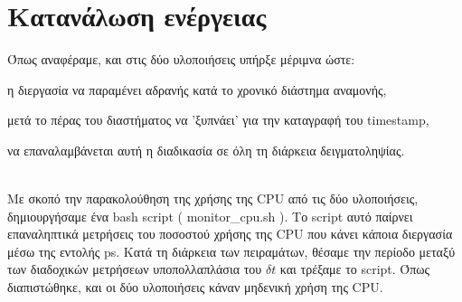 \documentclass[a4paper,12pt]{article}
\begin{document}
\section{Κατανάλωση ενέργειας} 
Όπως αναφέραμε, και στις δύο υλοποιήσεις υπήρξε μέριμνα ώστε:
\begin{inparaitem}
\item η διεργασία να παραμένει αδρανής κατά το χρονικό διάστημα αναμονής,
\item μετά το πέρας του διαστήματος να 'ξυπνάει' για την καταγραφή του \textlatin{timestamp},
\item να επαναλαμβάνεται αυτή η διαδικασία σε όλη τη διάρκεια δειγματοληψίας.
\end{inparaitem}
\\
Με σκοπό την παρακολούθηση της χρήσης της \textlatin{CPU} από τις δύο υλοποιήσεις, δημιουργήσαμε ένα \textlatin{bash script} ( \textlatin{monitor\_cpu.sh} ). Το \textlatin{script} αυτό παίρνει επαναληπτικά μετρήσεις του ποσοστού χρήσης της \textlatin{CPU} που κάνει κάποια διεργασία μέσω της εντολής \textlatin{ps}. Κατά τη διάρκεια των πειραμάτων, θέσαμε την περίοδο μεταξύ των διαδοχικών μετρήσεων υποπολλαπλάσια του $\delta t$ και τρέξαμε το \textlatin{script}. Όπως διαπιστώθηκε, και οι δύο υλοποιήσεις κάναν μηδενική χρήση της \textlatin{CPU}.
\end{document}
